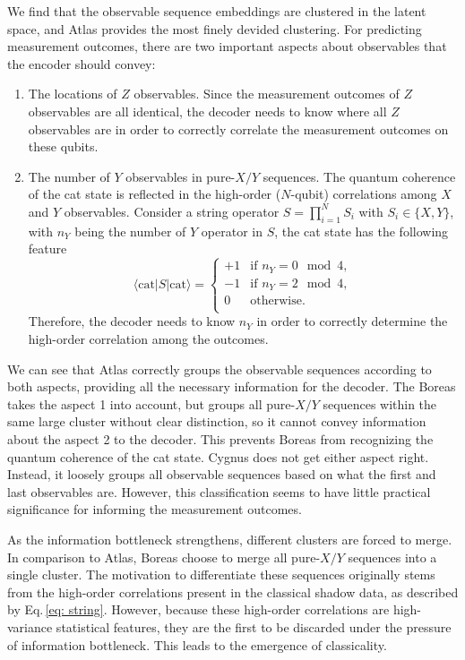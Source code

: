 \documentclass[fleqn,11pt]{wlscirep}
\newcommand{\bra}[1]{\langle #1|}
\newcommand{\ket}[1]{|#1 \rangle}
\newcommand{\eq}[1]{\begin{equation}#1\end{equation}}
\newcommand{\eqnref}[1]{Eq.\,\eqref{#1}}
\begin{document}
We find that the observable sequence embeddings are clustered in the latent space, and Atlas provides the most finely devided clustering. For predicting measurement outcomes, there are two important aspects about observables that the encoder should convey:
\begin{enumerate}
\item The locations of $Z$ observables. Since the measurement outcomes of $Z$ observables are all identical, the decoder needs to know where all $Z$ observables are in order to correctly correlate the measurement outcomes on these qubits.

\item The number of $Y$ observables in pure-$X/Y$ sequences. The quantum coherence of the cat state is reflected in the high-order ($N$-qubit) correlations among $X$ and $Y$ observables. Consider a string operator $S=\prod_{i=1}^{N}S_i$ with $S_i\in\{X,Y\}$, with $n_Y$ being the number of $Y$ operator in $S$, the cat state has the following feature 
\eq{\label{eq: string}
\bra{\text{cat}}S \ket{\text{cat}}=\left\{
\begin{array}{cc}
+1 & \text{if }n_Y =0\mod 4,\\
-1 & \text{if }n_Y =2\mod 4,\\
0 & \text{otherwise}.\\
\end{array}
\right.}
Therefore, the decoder needs to know $n_Y$ in order to correctly determine the high-order correlation among the outcomes.
\end{enumerate}
We can see that Atlas correctly groups the observable sequences according to both aspects, providing all the necessary information for the decoder. The Boreas takes the aspect 1 into account, but groups all pure-$X/Y$ sequences within the same large cluster without clear distinction, so it cannot convey information about the aspect 2 to the decoder. This prevents Boreas from recognizing the quantum coherence of the cat state. Cygnus does not get either aspect right. Instead, it loosely groups all observable sequences based on what the first and last observables are. However, this classification seems to have little practical significance for informing the measurement outcomes.

As the information bottleneck strengthens, different clusters are forced to merge. In comparison to Atlas, Boreas choose to merge all pure-$X/Y$ sequences into a single cluster. The motivation to differentiate these sequences originally stems from the high-order correlations present in the classical shadow data, as described by \eqnref{eq: string}. However, because these high-order correlations are high-variance statistical features, they are the first to be discarded under the pressure of information bottleneck. This leads to the emergence of classicality.
\end{document}

